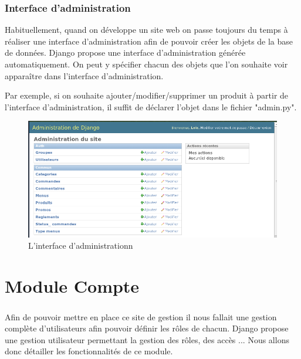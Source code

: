 \documentclass[twoside,UTF8]{EPURapport}
\begin{document}
    \subsection{Interface d'administration}
Habituellement, quand on développe un site web on passe toujours du temps à réaliser une interface d'administration afin de pouvoir créer les objets de la base de données. Django propose une interface d'administration générée automatiquement. On peut y spécifier chacun des objets que l'on souhaite voir apparaître dans l'interface d'administration.

Par exemple, si on souhaite ajouter/modifier/supprimer un produit à partir de l'interface d'administration, il suffit de déclarer l'objet dans le fichier "admin.py".

\begin{figure}[H]
    \centering
    \includegraphics[width=\linewidth]{./logos/admin.png}
    \caption{L'interface d'administrationn}
\end{figure}

\chapter{Module Compte}

    \paragraph{}Afin de pouvoir mettre en place ce site de gestion il nous fallait une gestion complète d'utilisateurs afin pouvoir définir les rôles de chacun. Django propose une gestion utilisateur permettant la gestion des rôles, des accès ... Nous allons donc détailler les fonctionnalités de ce module.
\end{document}
